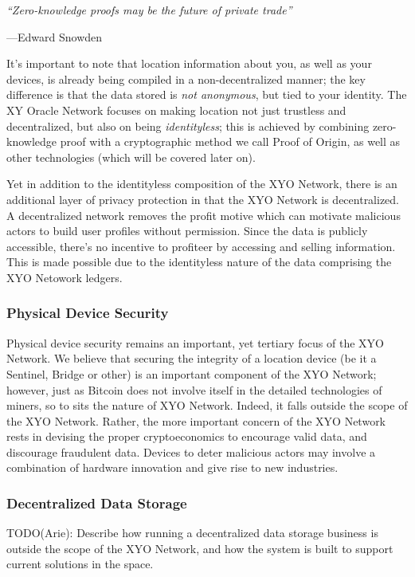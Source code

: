 \documentclass{article}
\begin{document}
\begin{displayquote}\textit{``Zero-knowledge proofs may be the future of private trade''}

\vspace{2mm}
---Edward Snowden
\end{displayquote}

It's important to note that location information about you, as well as your devices, is already being compiled in a non-decentralized manner; the key difference is that the data stored is \textit{not anonymous}, but tied to your identity. The XY Oracle Network focuses on making location not just trustless and decentralized, but also on being \textit{identityless}; this is achieved by combining zero-knowledge proof with a cryptographic method we call Proof of Origin, as well as other technologies (which will be covered later on).

Yet in addition to the identityless composition of the XYO Network, there is an additional layer of privacy protection in that the XYO Network is decentralized. A decentralized network removes the profit motive which can motivate malicious actors to build user profiles without permission. Since the data is publicly accessible, there's no incentive to profiteer by accessing and selling information. This is made possible due to the identityless nature of the data comprising the XYO Netowork ledgers.

\subsubsection {Physical Device Security}
Physical device security remains an important, yet tertiary focus of the XYO Network. We believe that securing the integrity of a location device (be it a Sentinel, Bridge or other) is an important component of the XYO Network; however, just as Bitcoin does not involve itself in the detailed technologies of miners, so to sits the nature of XYO Network. Indeed, it falls outside the scope of the XYO Network. Rather, the more important concern of the XYO Network rests in devising the proper cryptoeconomics to encourage valid data, and discourage fraudulent data. Devices to deter malicious actors may involve a combination of hardware innovation and give rise to new industries.

\subsubsection {Decentralized Data Storage}
TODO(Arie): Describe how running a decentralized data storage business is outside the scope of the XYO Network, and how the system is built to support current solutions in the space.
\end{document}
